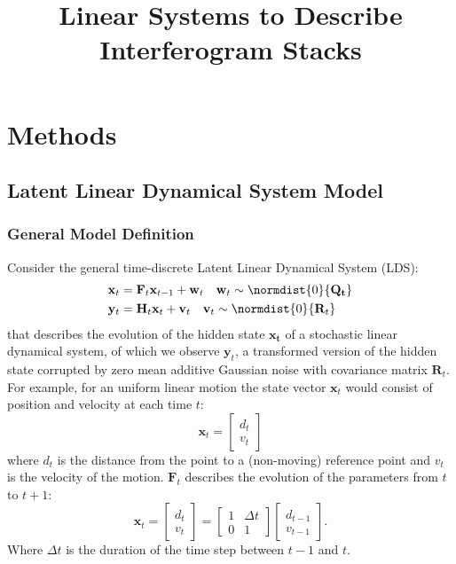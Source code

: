 \documentclass{article}
\title{Linear Systems to Describe Interferogram Stacks}
\begin{document}
\maketitle

\section{Methods}
\subsection{Latent Linear Dynamical System Model }\label{sec:displacement_model}
\subsubsection{General Model Definition}
Consider the general time-discrete Latent Linear Dynamical System (LDS)\cite{Barber2011}:
\begin{equation}\label{eq:state_recursion}
	\begin{aligned}
		\mathbf{x}_t &= \mathbf{F}_t \mathbf{x}_{t-1} + \mathbf{w}_t \quad \mathbf{w}_t \sim \normdist{0}{\mathbf{Q_t}} \\
		\mathbf{y}_{t} &= \mathbf{H}_{t}  \mathbf{x}_{t} + \mathbf{v}_t \quad \mathbf{v}_t   \sim \normdist{0}{\mathbf{R}_t}
	\end{aligned}
\end{equation}
that describes the evolution of the hidden state $\mathbf{x_t}$ of a stochastic linear dynamical system, of which we observe $\mathbf{y}_t$, a transformed version of the hidden state corrupted by zero mean additive Gaussian noise with covariance matrix $\mathbf{R}_t$.\\
For example, for an uniform linear motion the state vector $\mathbf{x}_t$ would consist of position and velocity at each time $t$:
\begin{equation}\label{eq:simplified_state}
\mathbf{x}_t = 
	\begin{bmatrix}
		d_{t}\\
		v_{t}
	\end{bmatrix}
\end{equation}
where $d_t$ is the distance from the point to a (non-moving) reference point and $v_t$ is the velocity of the motion. $\mathbf{F}_t$ describes the evolution of the parameters from $t$ to $t+1$: 
\begin{equation}\label{eq:simplified_F}
	\mathbf{x}_t = 
		\begin{bmatrix}
			d_{t}\\
			v_{t}
		\end{bmatrix} =
		\begin{bmatrix}
		1 & \Delta t\\
		0 & 1
		\end{bmatrix}
		\begin{bmatrix}
			d_{t-1}\\
			v_{t-1}
		\end{bmatrix}.
\end{equation}
Where $\Delta t$ is the duration of the time step between $t-1$ and $t$.\\
\end{document}
